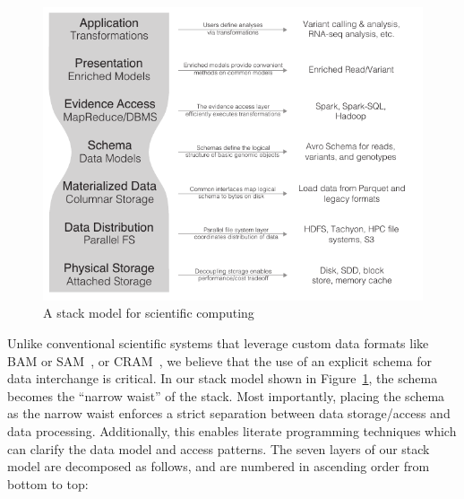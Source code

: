 \documentclass[phd]{ucbthesis}
\begin{document}
\begin{figure}[h]
\begin{center}
\includegraphics{graphs/expanded-stack-2.pdf}
\end{center}
\caption{A stack model for scientific computing}
\label{fig:stack-model}
\end{figure}

Unlike conventional scientific systems that leverage custom data formats like BAM or SAM~\cite{li09},
or CRAM~\cite{fritz11}, we believe that the use of an explicit schema for data interchange is critical.
In our stack model shown in Figure~\ref{fig:stack-model}, the schema becomes the ``narrow waist''
of the stack. Most importantly, placing the schema as the narrow waist enforces a strict separation
between data storage/access and data processing. Additionally, this enables literate programming
techniques which can clarify the data model and access patterns. The seven layers of our stack model
are decomposed as follows, and are numbered in ascending order from bottom to top:
\end{document}
